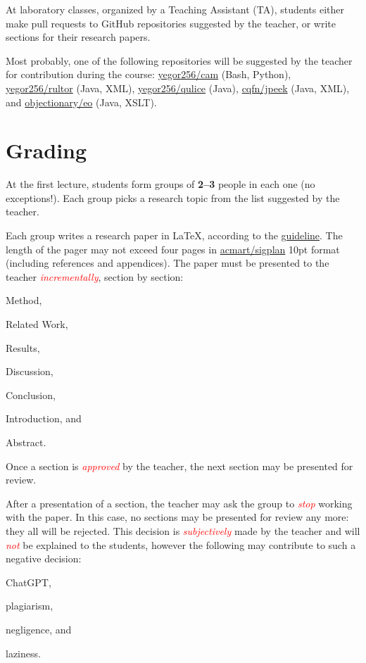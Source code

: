 \documentclass[nobrand,anonymous,nodate,nosecurity]{huawei}
\newcommand\angry[1]{\textcolor{red}{\emph{#1}}}
\begin{document}
{At laboratory classes, organized by a Teaching Assistant (TA),
students either make pull requests to
GitHub repositories suggested by the teacher, or write sections
for their research papers.

Most probably, one of the following repositories will be suggested
by the teacher for contribution during the course:
\href{https://github.com/yegor256/cam}{yegor256/cam} (Bash, Python),
\href{https://github.com/yegor256/rultor}{yegor256/rultor} (Java, XML),
\href{https://github.com/yegor256/qulice}{yegor256/qulice} (Java),
\href{https://github.com/cqfn/jpeek}{cqfn/jpeek} (Java, XML),
and
\href{https://github.com/objectionary/eo}{objectionary/eo} (Java, XSLT).

\newpage
\section*{Grading}

At the first lecture, students form groups of \textbf{2--3} people in each one (no exceptions!).
Each group picks a research topic from the list suggested by the teacher.

Each group writes a research paper in \LaTeX, according
to the \href{https://www.yegor256.com/2022/08/24/research-paper-template.html}{guideline}.
The length of the pager may not exceed four pages in
\href{https://ctan.org/pkg/acmart}{acmart/sigplan} 10pt format
(including references and appendices).
The paper must be presented to the teacher \angry{incrementally}, section by section:
\begin{inparaenum}[1)]
\item Method,
\item Related Work,
\item Results,
\item Discussion,
\item Conclusion,
\item Introduction,
and
\item Abstract.
\end{inparaenum}
Once a section is \angry{approved} by the teacher, the next section may be presented for review.

After a presentation of a section, the teacher may ask the group to \angry{stop}
working with the paper. In this case, no sections may be presented for review any more: they all will be rejected.
This decision is \angry{subjectively} made by the teacher and will \angry{not} be explained
to the students, however the following may contribute to such a
negative decision:
\begin{inparaenum}[a)]
    \item ChatGPT,
    \item plagiarism,
    \item negligence,
    and
    \item laziness.
\end{inparaenum}

}
\end{document}
